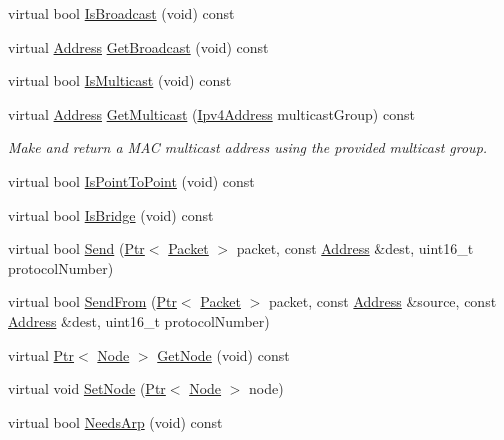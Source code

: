 \begin{DoxyCompactItemize}
\item 
virtual bool \hyperlink{classns3_1_1CsmaNetDevice_a36fbc65aebd3b5bd7d0747c3e5bf3b4b}{Is\+Broadcast} (void) const 
\item 
virtual \hyperlink{classns3_1_1Address}{Address} \hyperlink{classns3_1_1CsmaNetDevice_aebadc0653f18569208a61013cfe36947}{Get\+Broadcast} (void) const 
\item 
virtual bool \hyperlink{classns3_1_1CsmaNetDevice_a44bd5fb211a01d2b1df02db27d062200}{Is\+Multicast} (void) const 
\item 
virtual \hyperlink{classns3_1_1Address}{Address} \hyperlink{classns3_1_1CsmaNetDevice_ac7091be8b22f218e39572028c5fe45d2}{Get\+Multicast} (\hyperlink{classns3_1_1Ipv4Address}{Ipv4\+Address} multicast\+Group) const 
\begin{DoxyCompactList}\small\item\em Make and return a M\+AC multicast address using the provided multicast group. \end{DoxyCompactList}\item 
virtual bool \hyperlink{classns3_1_1CsmaNetDevice_a38a3517032b7973fbafca15103c07d52}{Is\+Point\+To\+Point} (void) const 
\item 
virtual bool \hyperlink{classns3_1_1CsmaNetDevice_a16114731c9a1ea434be6872fc5ec4196}{Is\+Bridge} (void) const 
\item 
virtual bool \hyperlink{classns3_1_1CsmaNetDevice_a6d3d0c60f8a2d60fbe006248bb6b119d}{Send} (\hyperlink{classns3_1_1Ptr}{Ptr}$<$ \hyperlink{classns3_1_1Packet}{Packet} $>$ packet, const \hyperlink{classns3_1_1Address}{Address} \&dest, uint16\+\_\+t protocol\+Number)
\item 
virtual bool \hyperlink{classns3_1_1CsmaNetDevice_ad7cb5da0e3fb59bd1670c8fa0af4b775}{Send\+From} (\hyperlink{classns3_1_1Ptr}{Ptr}$<$ \hyperlink{classns3_1_1Packet}{Packet} $>$ packet, const \hyperlink{classns3_1_1Address}{Address} \&source, const \hyperlink{classns3_1_1Address}{Address} \&dest, uint16\+\_\+t protocol\+Number)
\item 
virtual \hyperlink{classns3_1_1Ptr}{Ptr}$<$ \hyperlink{classns3_1_1Node}{Node} $>$ \hyperlink{classns3_1_1CsmaNetDevice_a4a6057b8a66a50306506b3560494f708}{Get\+Node} (void) const 
\item 
virtual void \hyperlink{classns3_1_1CsmaNetDevice_a81187adfa932888b01c57f146eb49991}{Set\+Node} (\hyperlink{classns3_1_1Ptr}{Ptr}$<$ \hyperlink{classns3_1_1Node}{Node} $>$ node)
\item 
virtual bool \hyperlink{classns3_1_1CsmaNetDevice_aaabe1b5821f22b8f3ee474a2ffa32516}{Needs\+Arp} (void) const 

\end{DoxyCompactItemize}
